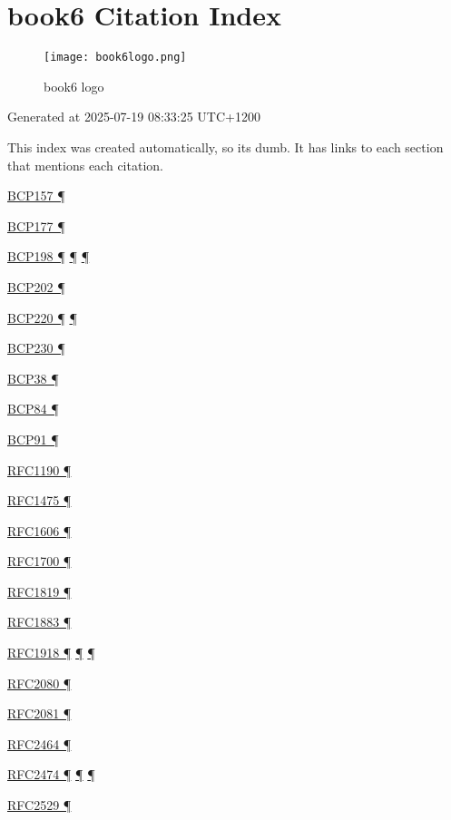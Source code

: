 \documentclass[
]{article}
\begin{document}
\pagebreak

\section{book6 Citation Index}\label{book6-citation-index}

\begin{figure}
\centering
\texttt{[image: book6logo.png]}
\caption{book6 logo}
\end{figure}

Generated at 2025-07-19 08:33:25 UTC+1200

This index was created automatically, so it\textquotesingle s dumb. It
has links to each section that mentions each citation.

\hyperref[addresses]{BCP157 ¶}

\hyperref[coexistence-with-legacy-ipv4]{BCP177 ¶}

\hyperref[addresses]{BCP198 ¶} \hyperref[routing]{¶}
\hyperref[markdown-usage]{¶}

\hyperref[energy-consumption]{BCP202 ¶}

\hyperref[ipv6-basic-technology]{BCP220 ¶} \hyperref[further-reading]{¶}

\hyperref[extension-headers-and-options]{BCP230 ¶}

\hyperref[filtering]{BCP38 ¶}

\hyperref[multi-prefix-operation]{BCP84 ¶}

\hyperref[dns]{BCP91 ¶}

\hyperref[why-version-6]{RFC1190 ¶}

\hyperref[why-version-6]{RFC1475 ¶}

\hyperref[why-version-6]{RFC1606 ¶}

\hyperref[why-version-6]{RFC1700 ¶}

\hyperref[why-version-6]{RFC1819 ¶}

\hyperref[why-version-6]{RFC1883 ¶}

\hyperref[dual-stack-scenarios]{RFC1918 ¶} \hyperref[tunnels]{¶}
\hyperref[obsolete-features-in-ipv6]{¶}

\hyperref[routing]{RFC2080 ¶}

\hyperref[routing]{RFC2081 ¶}

\hyperref[layer-2-functions]{RFC2464 ¶}

\hyperref[packet-format]{RFC2474 ¶}
\hyperref[traffic-class-and-flow-label]{¶}
\hyperref[transport-protocols]{¶}

\hyperref[obsolete-techniques]{RFC2529 ¶}
\end{document}
